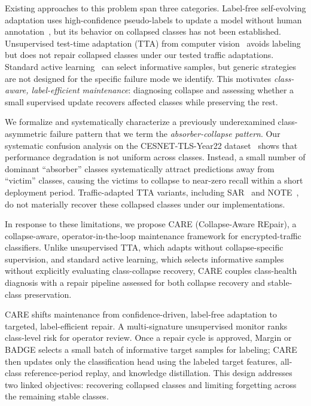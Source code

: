 \documentclass[journal]{IEEEtran}
\newcommand{\ours}{CARE}  %
\begin{document}
Existing approaches to this problem span three categories.
Label-free self-evolving adaptation uses high-confidence pseudo-labels to update a model without human annotation~\cite{chen2025selfevolving}, but its behavior on collapsed classes has not been established.
Unsupervised test-time adaptation (TTA) from computer vision~\cite{wang2021tent, niu2022eata, niu2023sar} avoids labeling but does not repair collapsed classes under our tested traffic adaptations.
Standard active learning~\cite{settles2009active, sener2018coreset, ash2020badge} can select informative samples, but generic strategies are not designed for the specific failure mode we identify.
This motivates \textit{class-aware, label-efficient maintenance}: diagnosing collapse and assessing whether a small supervised update recovers affected classes while preserving the rest.

We formalize and systematically characterize a previously underexamined class-asymmetric failure pattern that we term the \textit{absorber-collapse pattern}.
Our systematic confusion analysis on the CESNET-TLS-Year22 dataset~\cite{hynek2024cesnet} shows that performance degradation is not uniform across classes.
Instead, a small number of dominant ``absorber'' classes systematically attract predictions away from ``victim'' classes, causing the victims to collapse to near-zero recall within a short deployment period.
Traffic-adapted TTA variants, including SAR~\cite{niu2023sar} and NOTE~\cite{gong2022note}, do not materially recover these collapsed classes under our implementations.

In response to these limitations, we propose \ours{} (Collapse-Aware REpair), a collapse-aware, operator-in-the-loop maintenance framework for encrypted-traffic classifiers.
Unlike unsupervised TTA, which adapts without collapse-specific supervision, and standard active learning, which selects informative samples without explicitly evaluating class-collapse recovery, \ours{} couples class-health diagnosis with a repair pipeline assessed for both collapse recovery and stable-class preservation.

\ours{} shifts maintenance from confidence-driven, label-free adaptation to targeted, label-efficient repair.
A multi-signature unsupervised monitor ranks class-level risk for operator review.
Once a repair cycle is approved, Margin or BADGE selects a small batch of informative target samples for labeling; \ours{} then updates only the classification head using the labeled target features, all-class reference-period replay, and knowledge distillation.
This design addresses two linked objectives: recovering collapsed classes and limiting forgetting across the remaining stable classes.
\end{document}
